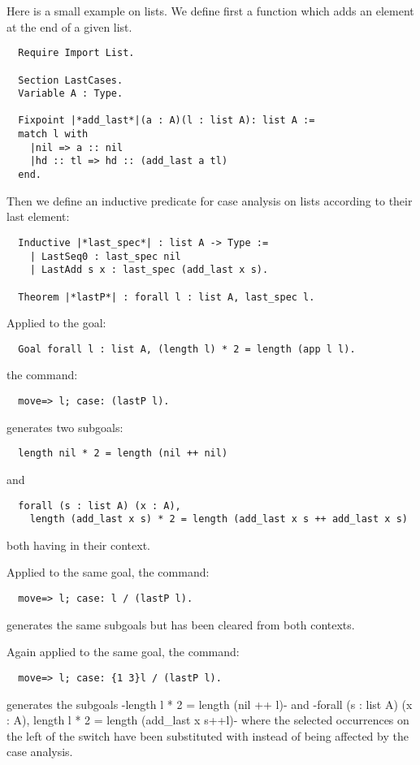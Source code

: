 Here is a small example on lists. We define first a function which
adds an element at the end of a given list.
\begin{lstlisting}
  Require Import List.

  Section LastCases.
  Variable A : Type.

  Fixpoint |*add_last*|(a : A)(l : list A): list A :=
  match l with
    |nil => a :: nil
    |hd :: tl => hd :: (add_last a tl)
  end.
\end{lstlisting}
Then we define an inductive predicate for
case analysis on lists according to their last element:
\begin{lstlisting}
  Inductive |*last_spec*| : list A -> Type :=
    | LastSeq0 : last_spec nil
    | LastAdd s x : last_spec (add_last x s).

  Theorem |*lastP*| : forall l : list A, last_spec l.
\end{lstlisting}
Applied to the goal:
\begin{lstlisting}
  Goal forall l : list A, (length l) * 2 = length (app l l).
\end{lstlisting}
the command:
\begin{lstlisting}
  move=> l; case: (lastP l).
\end{lstlisting}
generates two subgoals:
\begin{lstlisting}
  length nil * 2 = length (nil ++ nil)
\end{lstlisting}
and
\begin{lstlisting}
  forall (s : list A) (x : A),
    length (add_last x s) * 2 = length (add_last x s ++ add_last x s)
\end{lstlisting}
both having  in their context.

Applied to the same goal, the command:
\begin{lstlisting}
  move=> l; case: l / (lastP l).
\end{lstlisting}
generates the same subgoals but  has been cleared from both
contexts.

Again applied to the same goal, the command:
\begin{lstlisting}
  move=> l; case: {1 3}l / (lastP l).
\end{lstlisting}
generates the subgoals \ssrL-length l * 2 = length (nil ++ l)- and
\ssrL-forall (s : list A) (x : A), length l * 2 = length (add_last x s++l)-
where the selected occurrences on the left of the \ssrC{/} switch have
been substituted with  instead of being affected by the case
analysis.

